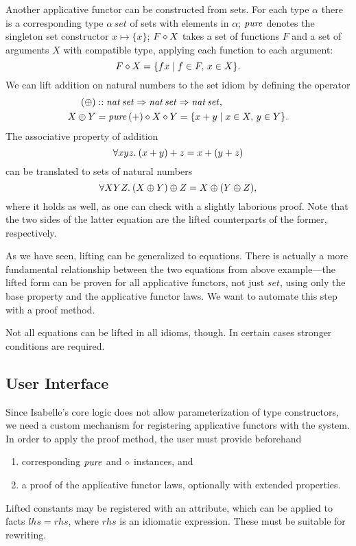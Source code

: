 \begin{example}\label{exmp:set-intro}
Another applicative functor can be constructed from sets.
For each type $\alpha$ there is a corresponding type $\alpha\,\mathit{set}$
of sets with elements in $\alpha$;
$\operatorname{\mathit{pure}}$ denotes the singleton set constructor $x \mapsto \{x\}$;
$F \diamond X$ takes a set of functions $F$ and a set of arguments $X$
with compatible type, applying each function to each argument:
\[ F \diamond X = \{f x\mid f \in F,\, x \in X\}. \]
We can lift addition on natural numbers to the set idiom by defining the operator
\begin{align*}
	(\oplus) &\mathrel{::} \mathit{nat}\,\mathit{set} \Rightarrow \mathit{nat}\,\mathit{set} \Rightarrow
		\mathit{nat}\,\mathit{set}, \\
	X \oplus Y &= \operatorname{\mathit{pure}}{(+)} \diamond X \diamond Y = \{x + y\mid x \in X,\, y \in Y\}.
\end{align*}
The associative property of addition
\[ \forall x y z.\>(x + y) + z = x + (y + z) \]
can be translated to sets of natural numbers
\[ \forall X Y Z.\>(X \oplus Y) \oplus Z = X \oplus (Y \oplus Z), \]
where it holds as well, as one can check with a slightly laborious proof.
Note that the two sides of the latter equation are the lifted counterparts
of the former, respectively.
\end{example}

As we have seen, lifting can be generalized to equations.
There is actually a more fundamental relationship between the two equations
from above example---the lifted form can be proven for all applicative
functors, not just $\mathit{set}$, using only the base property and the
applicative functor laws.
We want to automate this step with a proof method.

Not all equations can be lifted in all idioms, though.
In certain cases stronger conditions are required.
\todo{}

\subsection{User Interface}\label{subsec:interface}

Since Isabelle's core logic does not allow parameterization of type constructors,
we need a custom mechanism for registering applicative functors with the
system.
In order to apply the proof method, the user must provide beforehand
\begin{enumerate}
	\item corresponding $\operatorname{\mathit{pure}}$ and $\diamond$ instances, and
	\item a proof of the applicative functor laws, optionally with extended
	properties.
\end{enumerate}
Lifted constants may be registered with an attribute, which can be applied to
facts $\mathit{lhs} = \mathit{rhs}$, where $\mathit{rhs}$ is an idiomatic
expression.
These must be suitable for rewriting.

